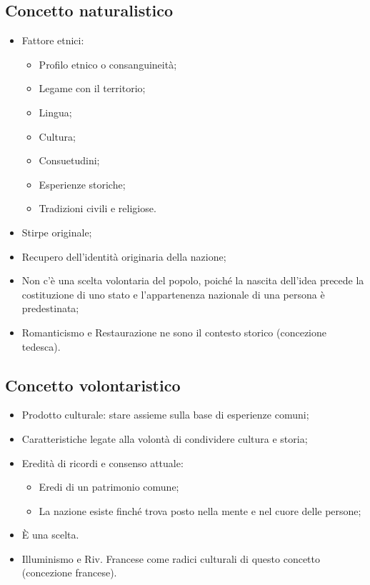 \documentclass{article}
\begin{document}
\subsection{Concetto naturalistico}
\begin{itemize}
    \item Fattore etnici:
        \begin{itemize}
            \item Profilo etnico o consanguineità;
            \item Legame con il territorio;
            \item Lingua;
            \item Cultura;
            \item Consuetudini;
            \item Esperienze storiche;
            \item Tradizioni civili e religiose.
        \end{itemize}
    \item Stirpe originale;
    \item Recupero dell'identità originaria della nazione;
    \item Non c'è una scelta volontaria del popolo, poiché la nascita dell'idea precede la
        costituzione di uno stato e l'appartenenza nazionale di una persona è predestinata;
    \item Romanticismo e Restaurazione ne sono il contesto storico (concezione tedesca).
\end{itemize}

\subsection{Concetto volontaristico}
\begin{itemize}
    \item Prodotto culturale: stare assieme sulla base di esperienze comuni;
    \item Caratteristiche legate alla volontà di condividere cultura e storia;
    \item Eredità di ricordi e consenso attuale:
        \begin{itemize}
            \item Eredi di un patrimonio comune;
            \item La nazione esiste finché trova posto nella mente e nel cuore delle persone;
        \end{itemize}
    \item È una scelta.
    \item Illuminismo e Riv. Francese come radici culturali di questo concetto (concezione
        francese).
\end{itemize}
\end{document}
